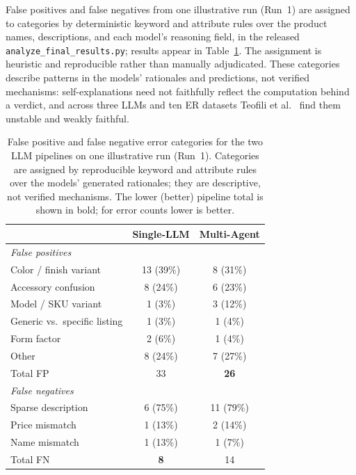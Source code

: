 \documentclass[sigconf]{acmart}
\begin{document}
False positives and false negatives from one illustrative run (Run~1) are assigned to categories by deterministic keyword and attribute rules over the product names, descriptions, and each model's reasoning field, in the released \texttt{analyze\_final\_results.py}; results appear in Table~\ref{tab:error-cats}.
The assignment is heuristic and reproducible rather than manually adjudicated.
These categories describe patterns in the models' rationales and predictions, not verified mechanisms: self-explanations need not faithfully reflect the computation behind a verdict, and across three LLMs and ten ER datasets Teofili et al.~\cite{teofili2026trust} find them unstable and weakly faithful.

\begin{table}[h]
  \centering
  \caption{False positive and false negative error categories for the two LLM pipelines on one illustrative run (Run~1). Categories are assigned by reproducible keyword and attribute rules over the models' generated rationales; they are descriptive, not verified mechanisms. The lower (better) pipeline total is shown in bold; for error counts lower is better.}
  \label{tab:error-cats}
  \small
  \begin{tabular}{lcc}
    \toprule
     & \textbf{Single-LLM} & \textbf{Multi-Agent} \\
    \midrule
    \multicolumn{3}{l}{\textit{False positives}} \\
    \quad Color / finish variant        & 13 (39\%) & 8 (31\%)  \\
    \quad Accessory confusion           & 8 (24\%)  & 6 (23\%)  \\
    \quad Model / SKU variant           & 1 (3\%)   & 3 (12\%)  \\
    \quad Generic vs.\ specific listing & 1 (3\%)   & 1 (4\%)   \\
    \quad Form factor                   & 2 (6\%)   & 1 (4\%)   \\
    \quad Other                         & 8 (24\%)  & 7 (27\%)  \\
    \quad Total FP                      & 33        & \textbf{26} \\
    \midrule
    \multicolumn{3}{l}{\textit{False negatives}} \\
    \quad Sparse description            & 6 (75\%)  & 11 (79\%) \\
    \quad Price mismatch                & 1 (13\%)  & 2 (14\%)  \\
    \quad Name mismatch                 & 1 (13\%)  & 1 (7\%)   \\
    \quad Total FN                      & \textbf{8}  & 14 \\
    \bottomrule
  \end{tabular}
\end{table}
\end{document}
